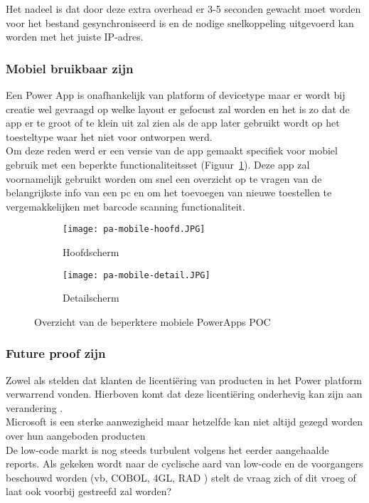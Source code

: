 Het nadeel is dat door deze extra overhead er 3-5 seconden gewacht moet worden voor het bestand gesynchroniseerd is en de nodige snelkoppeling uitgevoerd kan worden met het juiste IP-adres.

\subsubsection{Mobiel bruikbaar zijn}

Een Power App is onafhankelijk van platform of devicetype maar er wordt bij creatie wel gevraagd op welke layout er gefocust zal worden en het is zo dat de app er te groot of te klein uit zal zien als de app later gebruikt wordt op het toesteltype waar het niet voor ontworpen werd.\\
Om deze reden werd er een versie van de app gemaakt specifiek voor mobiel gebruik met een beperkte functionaliteitsset (Figuur~\ref{fig:pa-mobile}). Deze app zal voornamelijk gebruikt worden om snel een overzicht op te vragen van de belangrijkste info van een pc en om het toevoegen van nieuwe toestellen te vergemakkelijken met barcode scanning functionaliteit.

\begin{figure}[h!]
    \centering
    \begin{subfigure}[b]{0.45\linewidth}
        \texttt{[image: pa-mobile-hoofd.JPG]}
        \caption{Hoofdscherm}
    \end{subfigure}
    \begin{subfigure}[b]{0.45\linewidth}
        \texttt{[image: pa-mobile-detail.JPG]}
        \caption{Detailscherm}
    \end{subfigure}
    \caption{Overzicht van de beperktere mobiele PowerApps POC}
    \label{fig:pa-mobile}
\end{figure}

\subsubsection{Future proof zijn}

Zowel \textcite{Rymer2019} als \textcite{Vincent2019} stelden dat klanten de licentiëring van producten in het Power platform verwarrend vonden. Hierboven komt dat deze licentiëring onderhevig kan zijn aan verandering \autocite{Pohl2019}.\\
Microsoft is een sterke aanwezigheid maar hetzelfde kan niet altijd gezegd worden over hun aangeboden producten \autocite{Bott2018}\\
De low-code markt is nog steeds turbulent volgens het eerder aangehaalde reports.
Als gekeken wordt naar de cyclische aard van low-code en de voorgangers beschouwd worden (vb, COBOL, 4GL, RAD ) stelt de vraag zich of dit vroeg of laat ook voorbij gestreefd zal worden? \autocite{Reselman2018}

